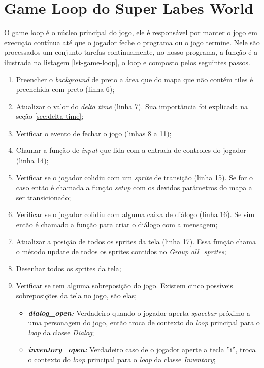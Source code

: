 \section{Game Loop do Super Labes World}
\label{sec:game-loop-super-labes-world}


O game loop é o núcleo principal do jogo, ele é responsável por manter o jogo em execução contínua até que o jogador feche o programa ou o jogo termine. Nele são processados um conjunto tarefas continuamente, no nosso programa, a função é a ilustrada na listagem \ref{lst-game-loop}, o loop e composto pelos seguintes passos.
\begin{enumerate}
    \item Preencher o \textit{background} de preto a área que do mapa que não contém tiles é preenchida com preto (linha 6);
    \item Atualizar o valor do \textit{delta time} (linha 7). Sua importância foi explicada na seção \ref{sec:delta-time};
    \item Verificar o evento de fechar o jogo (linhas 8 a 11);
    \item Chamar a função de \textit{input} que lida com a entrada de controles do jogador (linha 14);
    \item Verificar se o jogador colidiu com um \textit{sprite} de transição (linha 15). Se for o caso então é chamada a função \textit{setup} com os devidos parâmetros do mapa a ser transicionado;
    \item Verificar se o jogador colidiu com alguma caixa de diálogo (linha 16). Se sim então é chamado a função para criar o diálogo com a mensagem;
    \item Atualizar a posição de todos os sprites da tela (linha 17). Essa função chama o método update de todos os sprites contidos no \textit{Group all\_sprites}; 
    \item Desenhar todos os sprites da tela;
    \item Verificar se tem alguma sobreposição do jogo. Existem cinco possíveis sobreposições da tela no jogo, são elas;
        \begin{itemize}
        \item \textit{\textbf{dialog\_open: }} Verdadeiro quando o jogador aperta \textit{spacebar} 
        próximo a uma personagem do jogo, então troca de contexto do \textit{loop} principal para o \textit{loop} da classe \textit{Dialog};
        \item \textit{\textbf{inventory\_open: }}Verdadeiro caso de o jogador aperte a tecla ''i'', troca o contexto do \textit{loop} principal para o \textit{loop} da classe \textit{Inventory}; 

\end{itemize}
\end{enumerate}
